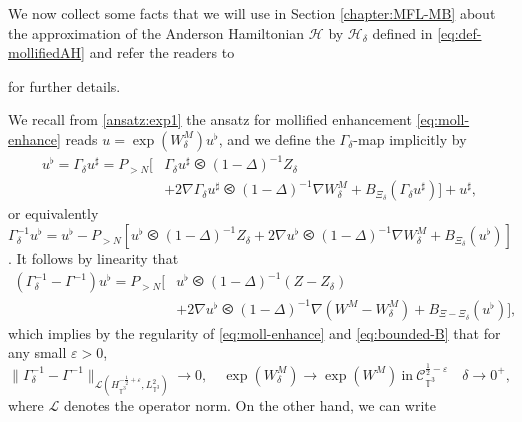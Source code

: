 We now collect some facts that we will use in Section \ref{chapter:MFL-MB} about the approximation of the
Anderson Hamiltonian $\mathcal{H}$ by $\mathcal{H}_{\delta}$ defined in
\eqref{eq:def-mollifiedAH} and refer the readers to {\cite{GUZ20} for further
details. 

\begin{rem}[Mollification]\label{rem:mollif-AH}
  We recall from \eqref{ansatz:exp1} the ansatz for
  mollified enhancement \eqref{eq:moll-enhance} reads $u = \exp (W_{\delta}^M)
  u^{\flat}$, and we define the $\Gamma_{\delta}$-map implicitly by
  \begin{equation}
  \begin{split}
    u^{\flat} = \Gamma_{\delta} u^{\sharp}
    = P_{> N} [& \Gamma_{\delta}
    u^{\sharp} \olessthan (1 - \Delta)^{- 1} Z_{\delta} \\
    & + 2 \nabla
    \Gamma_{\delta} u^{\sharp} \olessthan (1 - \Delta)^{- 1} \nabla
    W_{\delta}^M + B_{\Xi_{\delta}} (\Gamma_{\delta} u^{\sharp})] +
    u^{\sharp}, \label{eq:def-Gamma-delta}
    \end{split}
  \end{equation}
  or equivalently $\Gamma^{- 1}_{\delta} u^{\flat} = u^{\flat} - P_{> N} [u^{\flat}
     \olessthan (1 - \Delta)^{- 1} Z_{\delta} + 2 \nabla u^{\flat} \olessthan
     (1 - \Delta)^{- 1} \nabla W_{\delta}^M + B_{\Xi_{\delta}} (u^{\flat})]$. It follows by linearity that
  \begin{equation*}
  \begin{split}
  (\Gamma^{- 1}_{\delta} - \Gamma^{- 1}) u^{\flat} = P_{> N} [& u^{\flat}
     \olessthan (1 - \Delta)^{- 1} (Z - Z_{\delta}) \\ 
     & + 2 \nabla u^{\flat}
     \olessthan (1 - \Delta)^{- 1} \nabla (W^M - W_{\delta}^M) + B_{\Xi -
     \Xi_{\delta}} (u^{\flat})], 
     \end{split}
    \end{equation*} 
  which implies by the regularity of \eqref{eq:moll-enhance} and
  \eqref{eq:bounded-B} that for any small $\varepsilon > 0$,
  \begin{equation}
    \| \Gamma^{- 1}_{\delta} - \Gamma^{- 1} \|_{\mathcal{L}
    (H_{\mathbb{T}^3}^{- \frac{1}{2} + \varepsilon}, L_{\mathbb{T}^3}^2)}
    \rightarrow 0, \quad \exp (W^M_{\delta}) \rightarrow \exp (W^M) \ \mathrm{in} \
    \mathcal{C}_{\mathbb{T}^3}^{\frac{1}{2} - \varepsilon} \quad \delta
    \rightarrow 0^+, \label{eq:convergence-exp-Gamma}
   \end{equation}
  where $\mathcal{L}$ denotes the operator norm. On the other hand, we can write

\end{rem}}
